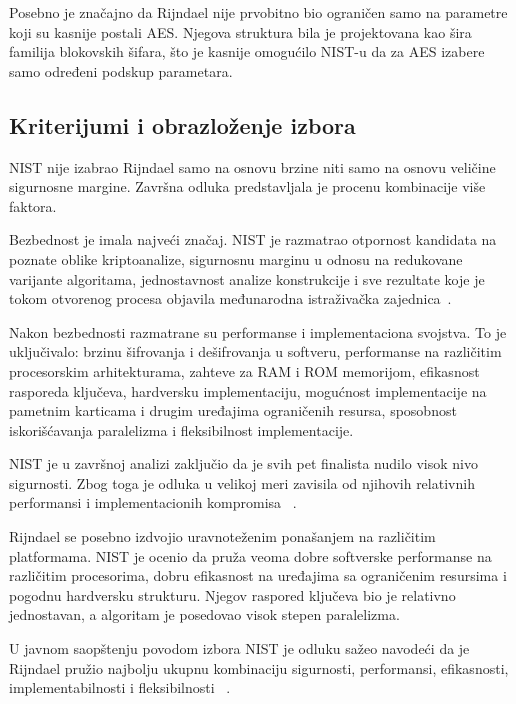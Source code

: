 Posebno je značajno da Rijndael nije prvobitno bio ograničen samo na
parametre koji su kasnije postali AES. Njegova struktura bila je
projektovana kao šira familija blokovskih šifara, što je kasnije
omogućilo NIST-u da za AES izabere samo određeni podskup parametara.


\subsection{Kriterijumi i obrazloženje izbora}
\label{subsec:aes_kriterijumi}

NIST nije izabrao Rijndael samo na osnovu brzine niti samo na osnovu
veličine sigurnosne margine. Završna odluka predstavljala je procenu
kombinacije više faktora.

Bezbednost je imala najveći značaj. NIST je razmatrao otpornost
kandidata na poznate oblike kriptoanalize, sigurnosnu marginu u odnosu
na redukovane varijante algoritama, jednostavnost analize konstrukcije
i sve rezultate koje je tokom otvorenog procesa objavila međunarodna
istraživačka zajednica~\cite{nist-aes-report-2001}.

Nakon bezbednosti razmatrane su performanse i implementaciona
svojstva. To je uključivalo:
brzinu šifrovanja i dešifrovanja u softveru, performanse na različitim procesorskim arhitekturama, zahteve za RAM i ROM memorijom, efikasnost rasporeda ključeva, hardversku implementaciju, mogućnost implementacije na pametnim karticama i drugim uređajima ograničenih resursa, sposobnost iskorišćavanja paralelizma i fleksibilnost implementacije.

NIST je u završnoj analizi zaključio da je svih pet finalista nudilo
visok nivo sigurnosti. Zbog toga je odluka u velikoj meri zavisila od
njihovih relativnih performansi i implementacionih kompromisa
~\cite{nist-aes-report-2001,nist-rijndael-selection-2000}.

Rijndael se posebno izdvojio uravnoteženim ponašanjem na različitim
platformama. NIST je ocenio da pruža veoma dobre softverske performanse
na različitim procesorima, dobru efikasnost na uređajima sa ograničenim
resursima i pogodnu hardversku strukturu. Njegov raspored ključeva bio
je relativno jednostavan, a algoritam je posedovao visok stepen
paralelizma.

U javnom saopštenju povodom izbora NIST je odluku sažeo navodeći da je
Rijndael pružio najbolju ukupnu kombinaciju sigurnosti, performansi,
efikasnosti, implementabilnosti i fleksibilnosti
~\cite{nist-rijndael-selection-2000}.

